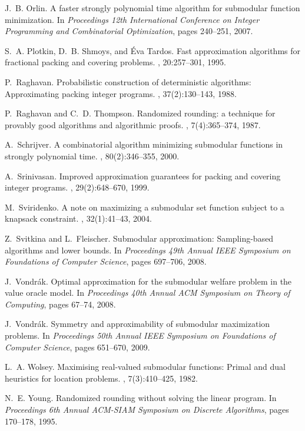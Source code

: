 \documentclass[11pt]{article}
\theoremstyle{plain}
\theoremstyle{definition}
\begin{document}
\begin{thebibliography}{10}
J.~B. Orlin.
\newblock A faster strongly polynomial time algorithm for submodular function
  minimization.
\newblock In {\em Proceedings 12th International Conference on Integer
  Programming and Combinatorial Optimization}, pages 240--251, 2007.

S.~A. Plotkin, D.~B. Shmoys, and \'{E}va Tardos.
\newblock Fast approximation algorithms for fractional packing and covering
  problems.
, 20:257--301, 1995.

P.~Raghavan.
\newblock Probabilistic construction of deterministic algorithms: Approximating
  packing integer programs.
, 37(2):130--143, 1988.

P.~Raghavan and C.~D. Thompson.
\newblock Randomized rounding: a technique for provably good algorithms and
  algorithmic proofs.
, 7(4):365--374, 1987.

A.~Schrijver.
\newblock A combinatorial algorithm minimizing submodular functions in strongly
  polynomial time.
, 80(2):346--355, 2000.

A.~Srinivasan.
\newblock Improved approximation guarantees for packing and covering integer
  programs.
, 29(2):648--670, 1999.

M.~Sviridenko.
\newblock A note on maximizing a submodular set function subject to a knapsack
  constraint.
, 32(1):41--43, 2004.

Z.~Svitkina and L.~Fleischer.
\newblock Submodular approximation: Sampling-based algorithms and lower bounds.
\newblock In {\em Proceedings 49th Annual IEEE Symposium on Foundations of
  Computer Science}, pages 697--706, 2008.

J.~Vondr{\'a}k.
\newblock Optimal approximation for the submodular welfare problem in the value
  oracle model.
\newblock In {\em Proceedings 40th Annual ACM Symposium on Theory of
  Computing}, pages 67--74, 2008.

J.~Vondr{\'a}k.
\newblock Symmetry and approximability of submodular maximization problems.
\newblock In {\em Proceedings 50th Annual IEEE Symposium on Foundations of
  Computer Science}, pages 651--670, 2009.

L.~A. Wolsey.
\newblock Maximising real-valued submodular functions: Primal and dual
  heuristics for location problems.
, 7(3):410--425, 1982.

N.~E. Young.
\newblock Randomized rounding without solving the linear program.
\newblock In {\em Proceedings 6th Annual ACM-SIAM Symposium on Discrete
  Algorithms}, pages 170--178, 1995.

\end{thebibliography}
\end{document}

